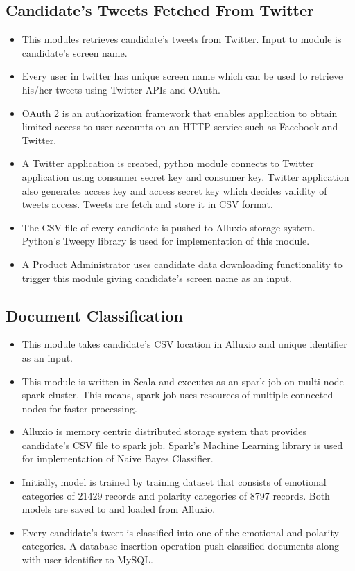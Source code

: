 \documentclass[oneside,a4paper,12pt]{pictreport}
\begin{document}
\subsection{Candidate's Tweets Fetched From Twitter}
\begin{itemize}
\item This modules retrieves candidate's tweets from Twitter. Input to module is candidate's screen name. 
\item Every user in twitter has unique screen name which can be used to retrieve his/her tweets using Twitter APIs and OAuth. 
\item OAuth 2 is an authorization framework that enables application to obtain limited access to user accounts on an HTTP service such as Facebook and Twitter. 
\item A Twitter application is created, python module connects to Twitter application using consumer secret key and consumer key. Twitter application also generates access key and access secret key which decides validity of tweets access. Tweets are fetch and store it in CSV format. 
\item The CSV file of every candidate is pushed to Alluxio storage system. Python's Tweepy library is used for implementation of this module. 
\item A Product Administrator uses candidate data downloading functionality to trigger this module giving candidate's screen name as an input.
\end{itemize}
\subsection{Document Classification}
\begin{itemize}
\item This module takes candidate's CSV location in Alluxio and unique identifier as an input. 
\item This module is written in Scala and executes as an spark job on multi-node spark cluster. This means, spark job uses resources of multiple connected nodes for faster processing. 
\item Alluxio is memory centric distributed storage system that provides candidate's CSV file to spark job. Spark's Machine Learning library is used for  implementation of Naive Bayes Classifier. 
\item Initially, model is trained by training dataset that consists of emotional categories of 21429 records and polarity categories of 8797 records. Both models are saved to and loaded from Alluxio. 
\item Every candidate's tweet is classified into one of the emotional and polarity categories. A database insertion operation push classified documents along with user identifier to MySQL.
\end{itemize}
\end{document}
